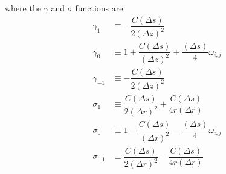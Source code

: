 \documentclass[11pt]{article} %
\begin{document}
\noindent 
where the $\gamma$ and $\sigma$ functions are:
\begin{align}
\gamma_1 &\equiv -\dfrac{C (\Delta s)}{2(\Delta z)^2} \\
\gamma_0 &\equiv 1 + \dfrac{C(\Delta s)}{(\Delta z)^2} + \dfrac{(\Delta s)}{4} \omega_{i,j} \\
\gamma_{-1} &\equiv -\dfrac{C (\Delta s)}{2(\Delta z)^2} \\
\sigma_1 &\equiv \dfrac{C (\Delta s)}{2(\Delta r)^2}  + \dfrac{C(\Delta s)}{4r(\Delta r)} \\
\sigma_0 &\equiv 1 - \dfrac{C (\Delta s)}{(\Delta r)^2} - \dfrac{(\Delta s)}{4} \omega_{i,j} \\
\sigma_{-1}  &\equiv \dfrac{C (\Delta s)}{2(\Delta r)^2}  - \dfrac{C(\Delta s)}{4r(\Delta r)} 
\end{align} \\[12pt]
\end{document}
